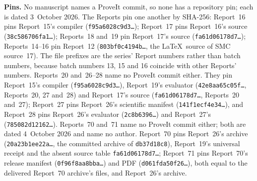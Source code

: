 \documentclass[11pt,a4paper]{article}
\numberwithin{equation}{section}
\begin{document}
\textbf{Pins.} No manuscript names a ProveIt commit, so none has a repository pin; each is dated 3~October 2026. The Reports pin one another by SHA-256: Report~16 pins Report~15's compiler (\texttt{f95a6028c9d3\ldots}); Report~17 pins Report~16's source (\texttt{38c586706fa1\ldots}); Reports~18 and~19 pin Report~17's source (\texttt{fa61d06178d7\ldots}); Reports~14--16 pin Report~12 (\texttt{803bf0c4194b\ldots}, the \LaTeX\ source of SMC source~17). The file prefixes are the series' Report numbers rather than batch numbers, because batch numbers 13, 15 and 16 coincide with other Reports' numbers. Reports~20 and~26--28 name no ProveIt commit either. They pin Report~15's compiler (\texttt{f95a6028c9d3\ldots}), Report~19's evaluator (\texttt{42e8aa65c05f\ldots}, Reports~20, 27 and~28) and Report~17's source (\texttt{fa61d06178d7\ldots}, Reports~20 and~27); Report~27 pins Report~26's scientific manifest (\texttt{141f1ecf4e34\ldots}), and Report~28 pins Report~26's evaluator (\texttt{2c8b6396\ldots}) and Report~27's (\texttt{785082d12162\ldots}). Reports~70 and~71 name no ProveIt commit either; both are dated 4~October 2026 and name no author. Report~70 pins Report~26's archive (\texttt{20a23b1ee22a\ldots}, the committed archive of \texttt{db37d18c8}), Report~19's universal receipt and the absent source table \texttt{fa61d06178d7\ldots}; Report~71 pins Report~70's release manifest (\texttt{0f96f8aa8bba\ldots}) and PDF (\texttt{d061fda50f26\ldots}), both equal to the delivered Report~70 archive's files, and Report~26's archive.
\end{document}
